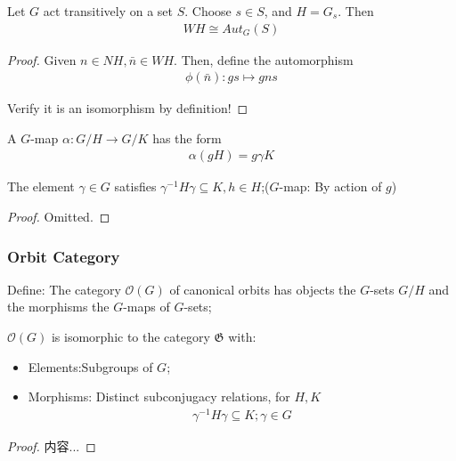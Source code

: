 \documentclass[Total.tex]{subfiles}
\begin{document}
			\begin{lemma}
				Let $G$ act transitively on a set $S$. Choose $s\in S$, and $H=G_s$. Then
				\begin{gather*}
					WH\cong Aut_G(S)
				\end{gather*}
			\end{lemma}
			\begin{proof}
				Given $n\in NH, \bar{n}\in WH$. Then, define the automorphism
				\begin{gather*}
					\phi(\bar{n}):gs\mapsto gns
				\end{gather*}
				
				Verify it is an isomorphism by definition!
			\end{proof}
			
			\begin{lemma}
				A $G$-map $\alpha:G/H\rightarrow G/K$ has the form
				\begin{gather*}
					\alpha(gH)=g\gamma K
				\end{gather*}
				
				The element $\gamma\in G$ satisfies $\gamma^{-1}H\gamma\subseteq K,h\in H$;($G$-map: By action of $g$)
			\end{lemma}
			\begin{proof}
				Omitted.
			\end{proof}
			\subsubsection{Orbit Category}
			\begin{Def}
				Define: The category $\mathcal{O}(G)$ of canonical orbits has objects the $G$-sets $G/H$ and the morphisms the $G$-maps of $G$-sets;
			\end{Def}
			
			\begin{corollary}
				$\mathcal{O}(G)$ is isomorphic to the category $\mathfrak{G}$ with:
				\begin{itemize}
					\item Elements:Subgroups of $G$;
					\item Morphisms: Distinct subconjugacy relations, for $H,K$
					\begin{gather*}
						\gamma^{-1}H\gamma\subseteq K;\gamma\in G
					\end{gather*}
				\end{itemize}
			\end{corollary}
			\begin{proof}
				内容...
			\end{proof}
			
\end{document}
